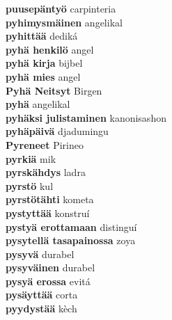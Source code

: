 \textbf{ puusepäntyö  } carpinteria \\
\textbf{ pyhimysmäinen  } angelikal \\
\textbf{ pyhittää  } dediká \\
\textbf{ pyhä henkilö  } angel \\
\textbf{ pyhä kirja  } bijbel \\
\textbf{ pyhä mies  } angel \\
\textbf{ Pyhä Neitsyt  } Birgen \\
\textbf{ pyhä  } angelikal \\
\textbf{ pyhäksi julistaminen  } kanonisashon \\
\textbf{ pyhäpäivä  } djadumingu \\
\textbf{ Pyreneet  } Pirineo \\
\textbf{ pyrkiä  } mik \\
\textbf{ pyrskähdys  } ladra \\
\textbf{ pyrstö  } kul \\
\textbf{ pyrstötähti  } kometa \\
\textbf{ pystyttää  } konstruí \\
\textbf{ pystyä erottamaan  } distinguí \\
\textbf{ pysytellä tasapainossa  } zoya \\
\textbf{ pysyvä  } durabel \\
\textbf{ pysyväinen  } durabel \\
\textbf{ pysyä erossa  } evitá \\
\textbf{ pysäyttää  } corta \\
\textbf{ pyydystää  } kèch \\
